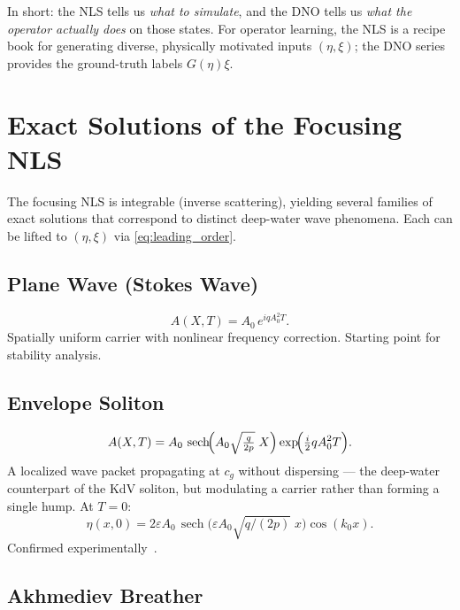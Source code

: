 \documentclass[11pt]{article}
\newcommand{\eps}{\varepsilon}
\begin{document}
In short: the NLS tells us \emph{what to simulate}, and the DNO tells
us \emph{what the operator actually does} on those states.
For operator learning, the NLS is a recipe book for generating
diverse, physically motivated inputs $(\eta,\xi)$; the DNO series
provides the ground-truth labels $G(\eta)\xi$.


\section{Exact Solutions of the Focusing NLS}
\label{sec:solutions}

The focusing NLS is integrable (inverse scattering), yielding
several families of exact solutions that correspond to distinct
deep-water wave phenomena.
Each can be lifted to $(\eta, \xi)$ via
\eqref{eq:leading_order}.

\subsection{Plane Wave (Stokes Wave)}
\begin{equation}
A(X,T) = A_0\,e^{iqA_0^2 T}.
\end{equation}
Spatially uniform carrier with nonlinear frequency correction.
Starting point for stability analysis.

\subsection{Envelope Soliton}
\begin{equation}
A(X,T) = A_0\,\operatorname{sech}\!\Bigl(A_0\sqrt{\tfrac{q}{2p}}\;X\Bigr)
\exp\!\Bigl(\tfrac{i}{2}qA_0^2 T\Bigr).
\label{eq:envelope_soliton}
\end{equation}
A localized wave packet propagating at $c_g$ without dispersing ---
the deep-water counterpart of the KdV soliton, but modulating a carrier
rather than forming a single hump.
At $T = 0$:
\begin{equation}
\eta(x,0) = 2\eps A_0\,
\operatorname{sech}\!\bigl(\eps A_0\sqrt{q/(2p)}\;x\bigr)\cos(k_0 x).
\label{eq:eta_soliton}
\end{equation}
Confirmed experimentally~\cite{shemer2013}.

\subsection{Akhmediev Breather}
\end{document}
